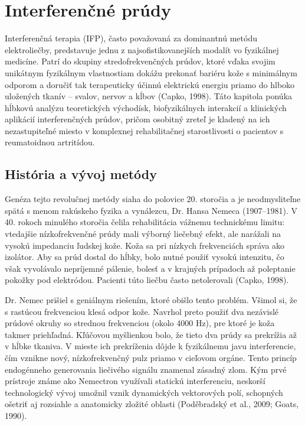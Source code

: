 \chapter{Interferenčné prúdy} Interferenčná terapia (IFP), často považovaná za dominantnú metódu elektroliečby, predstavuje jednu z najsofistikovanejších modalít vo fyzikálnej medicíne. Patrí do skupiny stredofrekvenčných prúdov, ktoré vďaka svojim unikátnym fyzikálnym vlastnostiam dokážu prekonať bariéru kože s minimálnym odporom a doručiť tak terapeuticky účinnú elektrickú energiu priamo do hlboko uložených tkanív – svalov, nervov a kĺbov (Capko, 1998). Táto kapitola ponúka hĺbkovú analýzu teoretických východísk, biofyzikálnych interakcií a klinických aplikácií interferenčných prúdov, pričom osobitný zreteľ je kladený na ich nezastupiteľné miesto v komplexnej rehabilitačnej starostlivosti o pacientov s reumatoidnou artritídou. 

\section{História a vývoj metódy}

Genéza tejto revolučnej metódy siaha do polovice 20. storočia a je neodmysliteľne spätá s menom rakúskeho fyzika a vynálezcu, Dr. Hansa Nemeca (1907–1981). V 40. rokoch minulého storočia čelila rehabilitácia vážnemu technickému limitu: vtedajšie nízkofrekvenčné prúdy mali výborný liečebný efekt, ale narážali na vysokú impedanciu ľudskej kože. Koža sa pri nízkych frekvenciách správa ako izolátor. Aby sa prúd dostal do hĺbky, bolo nutné použiť vysokú intenzitu, čo však vyvolávalo nepríjemné pálenie, bolesť a v krajných prípadoch až poleptanie pokožky pod elektródou. Pacienti túto liečbu často netolerovali (Capko, 1998). 

Dr. Nemec prišiel s geniálnym riešením, ktoré obišlo tento problém. Všimol si, že s rastúcou frekvenciou klesá odpor kože. Navrhol preto použiť dva nezávislé prúdové okruhy so strednou frekvenciou (okolo 4000 Hz), pre ktoré je koža takmer priehľadná. Kľúčovou myšlienkou bolo, že tieto dva prúdy sa prekrížia až v hĺbke tkaniva. V mieste ich prekríženia dôjde k fyzikálnemu javu interferencie, čím vznikne nový, nízkofrekvenčný pulz priamo v cieľovom orgáne. Tento princíp endogénneho generovania liečivého signálu znamenal zásadný zlom. Kým prvé prístroje známe ako Nemectron využívali statickú interferenciu, neskorší technologický vývoj umožnil vznik dynamických vektorových polí, schopných ošetriť aj rozsiahle a anatomicky zložité oblasti (Poděbradský et al., 2009; Goats, 1990). 

